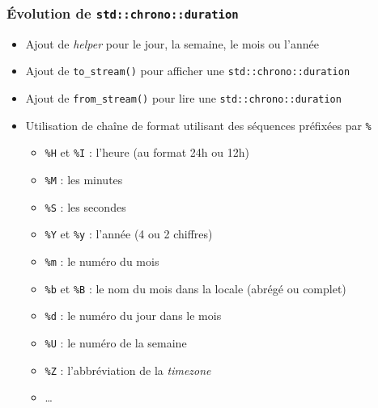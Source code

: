 \documentclass[C++.tex]{subfiles}
\begin{document}
\begin{frame}[fragile]
	\frametitle{Évolution de \lstinline|std::chrono::duration|}
	\begin{itemize}
		\item Ajout de \textit{helper} pour le jour, la semaine, le mois ou l'année
		\item Ajout de \lstinline|to_stream()| pour afficher une \lstinline|std::chrono::duration|
		\item Ajout de \lstinline|from_stream()| pour lire une \lstinline|std::chrono::duration|
		\item Utilisation de chaîne de format utilisant des séquences préfixées par \lstinline|%|
		\begin{itemize}
			\item \lstinline|%H| et \lstinline|%I| : l'heure (au format 24h ou 12h)
			\item \lstinline|%M| : les minutes
			\item \lstinline|%S| : les secondes
			\item \lstinline|%Y| et \lstinline|%y| : l'année (4 ou 2 chiffres)
			\item \lstinline|%m| : le numéro du mois
			\item \lstinline|%b| et \lstinline|%B| :  le nom du mois dans la locale (abrégé ou complet)
			\item \lstinline|%d| : le numéro du jour dans le mois
			\item \lstinline|%U| : le numéro de la semaine
			\item \lstinline|%Z| : l'abbréviation de la \textit{timezone}
			\item \ldots


		\end{itemize}
	\end{itemize}
\end{frame}
\end{document}

